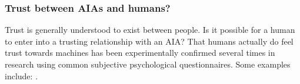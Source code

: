     \subsubsection{Trust between AIAs and humans?}
        Trust is generally understood to exist between people. Is it possible for a human to enter into a trusting relationship with an AIA?
        That humans actually do feel trust towards machines has been experimentally confirmed several times in research using common subjective psychological questionnaires. Some examples include: \citet{Muir1996-gt,Reeves1997-ad,Groom2007-bz,Mcknight2011-gv,Riley1996-qm,Bainbridge2011-pl,Kaniarasu2012-mo,Salem2015-md,Desai2012-rc, Freedy2007-sg, Wang2016-id, Inagaki1998-cl, Kaniarasu2013-ho}. 

